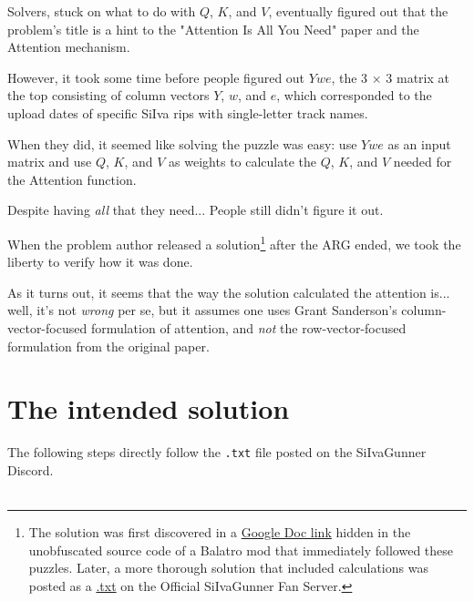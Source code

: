 \documentclass{article}
\begin{document}
Solvers, stuck on what to do with $Q$, $K$, and $V$, eventually figured out that the problem's title is a hint to the "Attention Is All You Need" paper and the Attention mechanism.

However, it took some time before people figured out $Ywe$, the 3 × 3 matrix at the top consisting of column vectors \href{https://siivagunner.fandom.com/wiki/Y_-_Kero_Blaster}{$Y$}, \href{https://siivagunner.fandom.com/wiki/W_-_Deltarune}{$w$}, and \href{https://siivagunner.fandom.com/wiki/Main_Theme_-_e}{$e$}, which corresponded to the upload dates of specific SiIva rips with single-letter track names.

When they did, it seemed like solving the puzzle was easy: use $Ywe$ as an input matrix and use $Q$, $K$, and $V$ as weights to calculate the $Q$, $K$, and $V$ needed for the Attention function.

Despite having \textit{all} that they need... People still didn't figure it out.

When the problem author released a solution\footnote{The solution was first discovered in a \href{https://docs.google.com/document/d/1GnD42mGr2TM23O65WiNPZae3WjgZuFj-4iYNhHk_TVg}{Google Doc link} hidden in the unobfuscated source code of a Balatro mod that immediately followed these puzzles. Later, a more thorough solution that included calculations was posted as a \href{https://discord.com/channels/220275955329925120/1319443290428280855/1331873078321610825}{.txt} on the Official SiIvaGunner Fan Server.} after the ARG ended, we took the liberty to verify how it was done.

As it turns out, it seems that the way the solution calculated the attention is... well, it's not \textit{wrong} per se, but it assumes one uses Grant Sanderson's column-vector-focused formulation of attention, and \emph{not} the row-vector-focused formulation from the original paper.

\section{The intended solution}

The following steps directly follow the \verb|.txt| file posted on the SiIvaGunner Discord.\\\\
\end{document}
